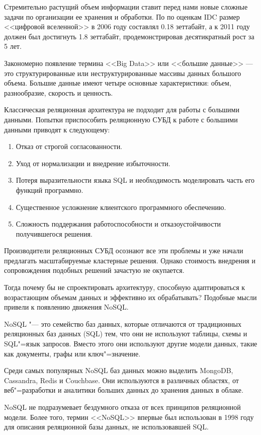 Стремительно растущий объем информации ставит перед нами новые сложные задачи по организации ее хранения и обработки.
По по оценкам IDC размер <<цифровой вселенной>> в 2006 году составлял 0.18 зеттабайт, а к 2011 году должен был достигнуть 1.8 зеттабайт, продемонстрировав десятикратный рост за 5 лет. 

Закономерно появление термина <<Big Data>> или <<большие данные>> — это структурированные или неструктурированные массивы данных большого объема. Большие данные имеют четыре основные характеристики: объем, разнообразие, скорость и ценность. 

Классическая реляционная архитектура не подходит для работы с большими данными. Попытки приспособить реляционную СУБД к работе с большими данными приводят к следующему:

\begin{enumerate}
    \item Отказ от строгой согласованности.
    \item Уход от нормализации и внедрение избыточности.
    \item Потеря выразительности языка SQL и необходимость моделировать часть его функций программно.
    \item Существенное усложнение клиентского программного обеспечению.
    \item Сложность поддержания работоспособности и отказоустойчивости получившегося решения.
\end{enumerate}

Производители реляционных СУБД осознают все эти проблемы и уже начали предлагать масштабируемые
кластерные решения. Однако стоимость внедрения и сопровождения подобных решений зачастую не окупается.

Тогда почему бы не спроектировать архитектуру,
способную адаптироваться к возрастающим объемам данных и эффективно их
обрабатывать? Подобные мысли привели к появлению движения NoSQL.

NoSQL "--- это семейство баз данных, которые отличаются от традиционных реляционных баз данных (SQL) тем, что они не используют таблицы, схемы и SQL"=язык запросов. Вместо этого они используют другие модели данных, такие как документы, графы или ключ"=значение.  

Среди самых популярных NoSQL баз данных можно выделить MongoDB, Cassandra, Redis и Couchbase. Они используются в различных областях, от веб"=разработки и аналитики больших данных до хранения данных в облаке.

NoSQL не подразумевает бездумного отказа от всех принципов реляционной модели. Более того, термин <<NoSQL>>
впервые был использован в 1998 году для описания реляционной базы данных, не использовавшей SQL. 

